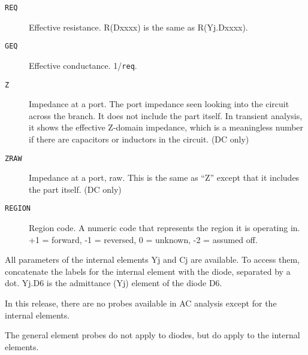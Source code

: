 \begin{description}
\item[{\tt REQ}] Effective resistance.  R(Dxxxx) is the same as
  R(Yj.Dxxxx).

\item[{\tt GEQ}] Effective conductance.  1/{\tt req}.
  
\item[{\tt Z}] Impedance at a port.  The port impedance seen looking
  into the circuit across the branch.  It does not include the part
  itself.  In transient analysis, it shows the effective Z-domain
  impedance, which is a meaningless number if there are capacitors or
  inductors in the circuit.  (DC only)
  
\item[{\tt ZRAW}] Impedance at a port, raw.  This is the same as ``Z''
  except that it includes the part itself. (DC only)
  
\item[{\tt REGION}] Region code.  A numeric code that represents the
  region it is operating in.  +1 = forward, -1 = reversed, 0 =
  unknown, -2 = assumed off.

\end{description}

All parameters of the internal elements Yj and Cj are available.  To
access them, concatenate the labels for the internal element with the
diode, separated by a dot.  Yj.D6 is the admittance (Yj) element of
the diode D6.

In this release, there are no probes available in AC analysis except
for the internal elements.

The general element probes do not apply to diodes, but do apply to the
internal elements.

